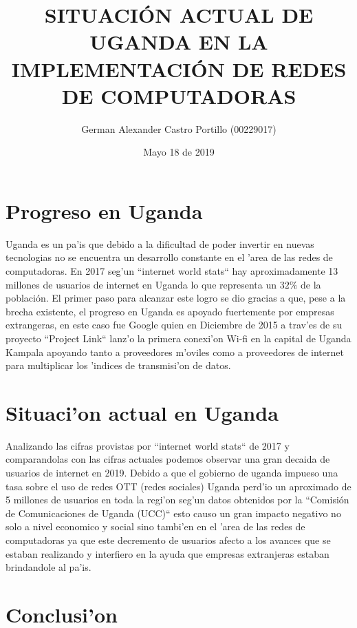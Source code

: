 \documentclass{article}
\title{SITUACI\'ON ACTUAL DE UGANDA EN LA IMPLEMENTACI\'ON DE REDES DE COMPUTADORAS\\}
\author{German Alexander Castro Portillo (00229017)}
\date{Mayo 18 de 2019}
\begin{document}
	\maketitle

	\section{Progreso en Uganda}
		\large{
			Uganda es un pa'is que debido a la dificultad de poder invertir en nuevas tecnologias no se encuentra un desarrollo constante en el 'area de las redes de computadoras. En 2017 seg'un ``internet world stats`` hay aproximadamente 13 millones de usuarios de internet en Uganda lo que representa un $32\%$ de la población. El primer paso para alcanzar este logro se dio gracias a que, pese a la brecha existente, el progreso en Uganda es apoyado fuertemente por empresas extrangeras, en este caso fue Google quien en Diciembre de 2015 a trav'es de su proyecto ``Project Link`` lanz'o la primera conexi'on Wi-fi en la capital de Uganda Kampala apoyando tanto a proveedores m'oviles como a proveedores de internet para multiplicar los 'indices de transmisi'on de datos.    
		}
	\section{Situaci'on actual en Uganda}
		\large{
			Analizando las cifras provistas por ``internet world stats`` de 2017 y comparandolas con las cifras actuales podemos observar una gran decaida de usuarios de internet en 2019. Debido a que el gobierno de uganda impueso una tasa sobre el uso de redes OTT (redes sociales) Uganda perd'io un aproximado de 5 millones de usuarios en toda la regi'on seg'un datos obtenidos por la ``Comisión de Comunicaciones de Uganda (UCC)`` esto causo un gran impacto negativo no solo a nivel economico y social sino tambi'en en el 'area de las redes de computadoras ya que este decremento de usuarios afecto a los avances que se estaban realizando y interfiero en la ayuda que empresas extranjeras estaban brindandole al pa'is.
		}
	\section{Conclusi'on}
		\large{
				
		}
	
\end{document}
